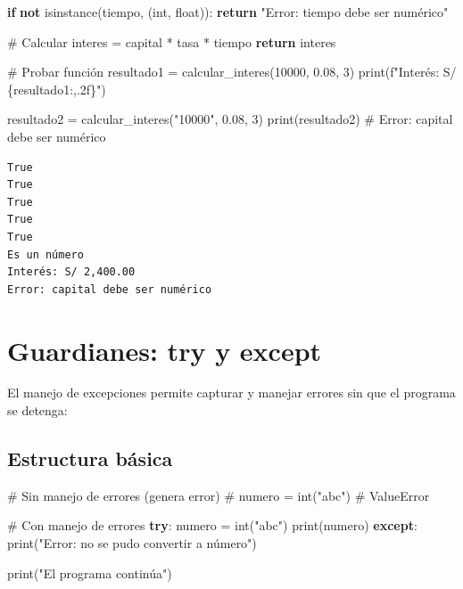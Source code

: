 \documentclass[
  doc,
  floatsintext,
  longtable,
  a4paper,
  nolmodern,
  notxfonts,
  notimes,
  12pt,
  colorlinks=true,linkcolor=blue,citecolor=blue,urlcolor=blue]{apa7}
\newenvironment{Shaded}{\begin{snugshade}}{\end{snugshade}}
\newcommand{\BuiltInTok}[1]{\textcolor[rgb]{0.00,0.23,0.31}{#1}}
\newcommand{\CommentTok}[1]{\textcolor[rgb]{0.37,0.37,0.37}{#1}}
\newcommand{\ControlFlowTok}[1]{\textcolor[rgb]{0.00,0.23,0.31}{\textbf{#1}}}
\newcommand{\DecValTok}[1]{\textcolor[rgb]{0.68,0.00,0.00}{#1}}
\newcommand{\FloatTok}[1]{\textcolor[rgb]{0.68,0.00,0.00}{#1}}
\newcommand{\KeywordTok}[1]{\textcolor[rgb]{0.00,0.23,0.31}{\textbf{#1}}}
\newcommand{\NormalTok}[1]{\textcolor[rgb]{0.00,0.23,0.31}{#1}}
\newcommand{\OperatorTok}[1]{\textcolor[rgb]{0.37,0.37,0.37}{#1}}
\newcommand{\SpecialCharTok}[1]{\textcolor[rgb]{0.37,0.37,0.37}{#1}}
\newcommand{\SpecialStringTok}[1]{\textcolor[rgb]{0.13,0.47,0.30}{#1}}
\newcommand{\StringTok}[1]{\textcolor[rgb]{0.13,0.47,0.30}{#1}}
\begin{document}
\begin{Shaded}
\begin{Highlighting}[]
    \ControlFlowTok{if} \KeywordTok{not} \BuiltInTok{isinstance}\NormalTok{(tiempo, (}\BuiltInTok{int}\NormalTok{, }\BuiltInTok{float}\NormalTok{)):}
        \ControlFlowTok{return} \StringTok{"Error: tiempo debe ser numérico"}
    
    \CommentTok{\# Calcular}
\NormalTok{    interes }\OperatorTok{=}\NormalTok{ capital }\OperatorTok{*}\NormalTok{ tasa }\OperatorTok{*}\NormalTok{ tiempo}
    \ControlFlowTok{return}\NormalTok{ interes}

\CommentTok{\# Probar función}
\NormalTok{resultado1 }\OperatorTok{=}\NormalTok{ calcular\_interes(}\DecValTok{10000}\NormalTok{, }\FloatTok{0.08}\NormalTok{, }\DecValTok{3}\NormalTok{)}
\BuiltInTok{print}\NormalTok{(}\SpecialStringTok{f"Interés: S/ }\SpecialCharTok{\{}\NormalTok{resultado1}\SpecialCharTok{:,.2f\}}\SpecialStringTok{"}\NormalTok{)}

\NormalTok{resultado2 }\OperatorTok{=}\NormalTok{ calcular\_interes(}\StringTok{"10000"}\NormalTok{, }\FloatTok{0.08}\NormalTok{, }\DecValTok{3}\NormalTok{)}
\BuiltInTok{print}\NormalTok{(resultado2)  }\CommentTok{\# Error: capital debe ser numérico}
\end{Highlighting}
\end{Shaded}

\begin{verbatim}
True
True
True
True
True
Es un número
Interés: S/ 2,400.00
Error: capital debe ser numérico
\end{verbatim}

\section{Guardianes: try y except}\label{guardianes-try-y-except}

El manejo de excepciones permite capturar y manejar errores sin que el
programa se detenga:

\subsection{Estructura básica}\label{estructura-buxe1sica-1}

\begin{Shaded}
\begin{Highlighting}[]
\CommentTok{\# Sin manejo de errores (genera error)}
\CommentTok{\# numero = int("abc")  \# ValueError}

\CommentTok{\# Con manejo de errores}
\ControlFlowTok{try}\NormalTok{:}
\NormalTok{    numero }\OperatorTok{=} \BuiltInTok{int}\NormalTok{(}\StringTok{"abc"}\NormalTok{)}
    \BuiltInTok{print}\NormalTok{(numero)}
\ControlFlowTok{except}\NormalTok{:}
    \BuiltInTok{print}\NormalTok{(}\StringTok{"Error: no se pudo convertir a número"}\NormalTok{)}

\BuiltInTok{print}\NormalTok{(}\StringTok{"El programa continúa"}\NormalTok{)}
\end{Highlighting}
\end{Shaded}
\end{document}
